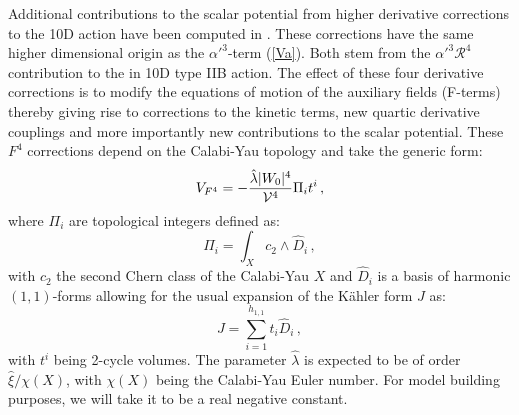 \documentclass[11pt,a4paper]{article}
\newcommand{\be}{\begin{equation}}
\newcommand{\ee}{\end{equation}}
\newcommand\mc{\mathcal}
\newcommand{\V}{{\cal{V}}}
\begin{document}
Additional contributions to the scalar potential from higher derivative corrections to the 10D action have been computed in \cite{Ciupke:2015msa}. These corrections have the same higher dimensional origin as the $\alpha'^3$-term (\ref{Va}). Both stem from the $\alpha'^3 \mc{R}^4$ contribution to the in 10D type IIB action. The effect of these four derivative corrections is to modify the equations of motion of the auxiliary fields (F-terms) thereby giving rise to corrections to the kinetic terms, new quartic derivative couplings and more importantly new contributions to the scalar potential.  These $F^4$ corrections depend on the Calabi-Yau topology and take the generic form:
\be
V_{F^4} = - \frac{\hat{\lambda} |W_0|^4}{\V^4} \Pi_i t^i\,,
\label{v1}
\ee
where $\Pi_i$ are topological integers defined as:
\be
\Pi_i = \int_X c_2 \wedge \hat{D}_i\,,
\ee
with $c_2$ the second Chern class of the Calabi-Yau $X$ and $\hat{D}_i$ is a basis of harmonic $(1,1)$-forms allowing for the usual expansion of the K\"ahler form $J$ as:
\be
J = \sum_{i=1}^{h_{1,1}} t_i \hat{D}_i\,,
\ee
with $t^i$ being 2-cycle volumes. The parameter $\hat{\lambda}$ is expected to be of order $\hat{\xi}/\chi(X)$, with $\chi(X)$ being the Calabi-Yau Euler number. For model building purposes, we will take it to be a real negative constant.
\end{document}

